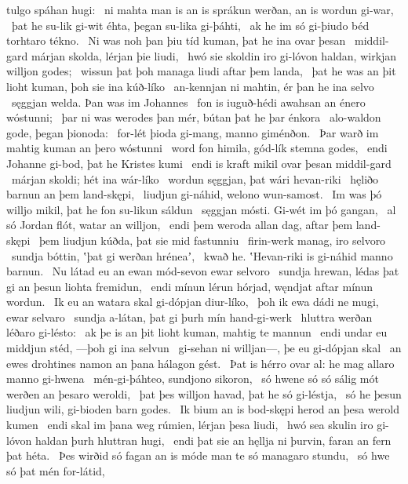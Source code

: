 tulgo spáhan hugi: \hld\ ni mahta man is an is sprákun werðan,
an is wordun gi-war, \hld\ þat he su-lik gi-wit éhta,
þegan su-lika gi-þáhti, \hld\ ak he im só gi-þiudo béd
torhtaro tékno. \hld\ Ni was noh þan þiu tíd kuman,
þat he ina ovar þesan \hld\ middil-gard márjan skolda,
lérjan þie liudi, \hld\ hwó sie skoldin iro gi-lóvon haldan,
wirkjan willjon godes; \hld\ wissun þat þoh managa
liudi aftar þem landa, \hld\ þat he was an þit lioht kuman,
þoh sie ina kúð-líko \hld\ an-kennjan ni mahtin,
ér þan he ina selvo \hld\ sęggjan welda.
Þan was im Johannes \hld\ fon is iuguð-hédi
awahsan an énero wóstunni; \hld\ þar ni was werodes þan mér,
bútan þat he þar énkora \hld\ alo-waldon gode,
þegan þionoda: \hld\ for-lét þioda gi-mang,
manno giménðon. \hld\ Þar warð im mahtig kuman
an þero wóstunni \hld\ word fon himila,
gód-lík stemna godes, \hld\ endi Johanne gi-bod,
þat he Kristes kumi \hld\ endi is kraft mikil
ovar þesan middil-gard \hld\ márjan skoldi;
hét ina wár-líko \hld\ wordun sęggjan,
þat wári hevan-riki \hld\ hęliðo barnun
an þem land-skępi, \hld\ liudjun gi-náhid,
welono wun-samost. \hld\ Im was þó willjo mikil,
þat he fon su-likun sáldun \hld\ sęggjan mósti.
Gi-wét im þó gangan, \hld\ al só Jordan flót,
watar an willjon, \hld\ endi þem weroda allan dag,
aftar þem land-skępi \hld\ þem liudjun kúðda,
þat sie mid fastunniu \hld\ firin-werk manag,
iro selvoro \hld\ sundja bóttin,
ʽþat gi werðan hréneaʼ, \hld\ kwað he. ʽHevan-riki is
gi-náhid manno barnun. \hld\ Nu látad eu an ewan mód-sevon
ewar selvoro \hld\ sundja hrewan,
lédas þat gi an þesun liohta fremidun, \hld\ endi mínun lérun hórjad,
węndjat aftar mínun wordun. \hld\ Ik eu an watara skal
gi-dópjan diur-líko, \hld\ þoh ik ewa dádi ne mugi,
ewar selvaro \hld\ sundja a-látan,
þat gi þurh mín hand-gi-werk \hld\ hluttra werðan
léðaro gi-lésto: \hld\ ak þe is an þit lioht kuman,
mahtig te mannun \hld\ endi undar eu middjun stéd,
—þoh gi ina selvun \hld\ gi-sehan ni willjan—,
þe eu gi-dópjan skal \hld\ an ewes drohtines namon
an þana hálagon gést. \hld\ Þat is hérro ovar al:
he mag allaro manno gi-hwena \hld\ mén-gi-þáhteo,
sundjono sikoron, \hld\ só hwene só só sálig mót
werðen an þesaro weroldi, \hld\ þat þes willjon havad,
þat he só gi-léstja, \hld\ só he þesun liudjun wili,
gi-bioden barn godes. \hld\ Ik bium an is bod-skępi herod
an þesa werold kumen \hld\ endi skal im þana weg rúmien,
lérjan þesa liudi, \hld\ hwó sea skulin iro gi-lóvon haldan
þurh hluttran hugi, \hld\ endi þat sie an hęllja ni þurvin,
faran an fern þat héta. \hld\ Þes wirðid só fagan an is móde
man te só managaro stundu, \hld\ só hwe só þat mén for-látid,
